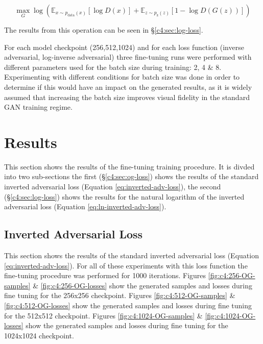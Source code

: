 \begin{equation} 
  \max_{G}\log(\mathbb{E}_{x\sim p_{\text{data}}(x)}[\log{D(x)}] +  \mathbb{E}_{z\sim p_{\text{z}}(z)}[1 - \log{D(G(z))}])
  \label{eq:ln-inverted-adv-loss}
  \end{equation}

The results from this operation can be seen in \S \ref{c4:sec:log-loss}.

For each model checkpoint (256,512,1024) and for each loss function (inverse adversarial, log-inverse adversarial) three fine-tuning runs were performed with different parameters used for the batch size during training: 2, 4 \& 8.
Experimenting with different conditions for batch size was done in order to determine if this would have an impact on the generated results, as it is widely assumed that increasing the batch size improves visual fidelity in the standard GAN training regime. 

\section{Results}
\label{c4:sec:results}

This section shows the results of the fine-tuning training procedure. 
It is divded into two sub-sections the first (\S \ref{c4:sec:og-loss}) shows the results of the standard inverted adversarial loss (Equation \ref{eq:inverted-adv-loss}), the second (\S \ref{c4:sec:log-loss}) shows the results for the natural logarithm of the inverted adversarial loss (Equation \ref{eq:ln-inverted-adv-loss}).

\subsection{Inverted Adversarial Loss}
\FloatBarrier

This section shows the results of the standard inverted adversarial loss (Equation \ref{eq:inverted-adv-loss}). For all of these experiments with this loss function the fine-tuning procedure was performed for 1000 iterations.
Figures \ref{fig:c4:256-OG-samples} \& \ref{fig:c4:256-OG-losses} show the generated samples and losses during fine tuning for the 256x256 checkpoint.
Figures \ref{fig:c4:512-OG-samples} \& \ref{fig:c4:512-OG-losses} show the generated samples and losses during fine tuning for the 512x512 checkpoint.
Figures \ref{fig:c4:1024-OG-samples} \& \ref{fig:c4:1024-OG-losses} show the generated samples and losses during fine tuning for the 1024x1024 checkpoint.

